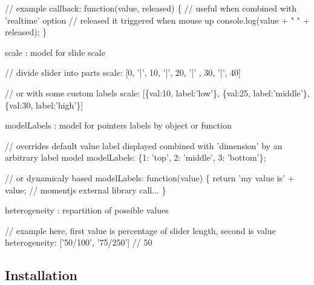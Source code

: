 \begin{DoxyCode}
// example
callback: function(value, released) \{
    // useful when combined with 'realtime' option
    // released it triggered when mouse up
    console.log(value + " " + released);
\}
\end{DoxyCode}



\begin{DoxyItemize}
\item {\ttfamily scale} \+: model for slide scale
\end{DoxyItemize}


\begin{DoxyCode}
// divide slider into parts
scale: [0, '|', 10, '|', 20, '|' , 30, '|', 40]

// or with some custom labels
scale: [\{val:10, label:'low'\}, \{val:25, label:'middle'\}, \{val:30, label:'high'\}]
\end{DoxyCode}



\begin{DoxyItemize}
\item {\ttfamily model\+Labels} \+: model for pointers labels by object or function
\end{DoxyItemize}


\begin{DoxyCode}
// overrides default value label displayed combined with 'dimension' by an arbitrary label model
modelLabels: \{1: 'top', 2: 'middle', 3: 'bottom'\};

// or dynamicaly based
modelLabels: function(value) \{
    return 'my value is' + value; // momentjs external library call...
\}
\end{DoxyCode}



\begin{DoxyItemize}
\item {\ttfamily heterogeneity} \+: repartition of possible values 
\begin{DoxyCode}
// example here, first value is percentage of slider length, second is value
heterogeneity: ['50/100', '75/250'] // 50%
\end{DoxyCode}

\end{DoxyItemize}

\subsection*{Installation }

